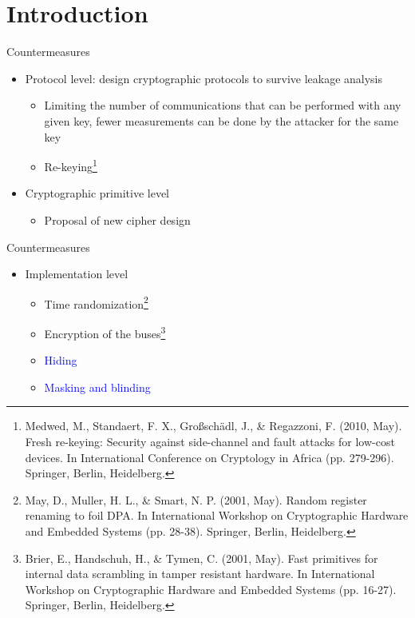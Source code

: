 \section{Introduction}
\begin{frame}{\VideoName}
    \tableofcontents[currentsection]
\end{frame}

\begin{frame}{Countermeasures}
    \begin{itemize}
        \item Protocol level: design cryptographic protocols to survive leakage analysis
        \begin{itemize}
            \item Limiting the number of communications that can be performed with any given key, fewer measurements can be done by the attacker for the same key
            \item Re-keying\footnote{Medwed, M., Standaert, F. X., Großschädl, J., \& Regazzoni, F. (2010, May). Fresh re-keying: Security against side-channel and fault attacks for low-cost devices. In International Conference on Cryptology in Africa (pp. 279-296). Springer, Berlin, Heidelberg.}
        \end{itemize}
         \item Cryptographic primitive level
        \begin{itemize}
            \item Proposal of new cipher design
        \end{itemize}
    \end{itemize}
\end{frame}

\begin{frame}{Countermeasures}
    \begin{itemize}
        \item Implementation level
        \begin{itemize}
            \item Time randomization\footnote{May, D., Muller, H. L., \& Smart, N. P. (2001, May). Random register renaming to foil DPA. In International Workshop on Cryptographic Hardware and Embedded Systems (pp. 28-38). Springer, Berlin, Heidelberg.}
            \item Encryption of the buses\footnote{Brier, E., Handschuh, H., \& Tymen, C. (2001, May). Fast primitives for internal data scrambling in tamper resistant hardware. In International Workshop on Cryptographic Hardware and Embedded Systems (pp. 16-27). Springer, Berlin, Heidelberg.}
            \item \textcolor{blue}{Hiding}
            \item \textcolor{blue}{Masking and blinding}
        \end{itemize}
    \end{itemize}
\end{frame}

